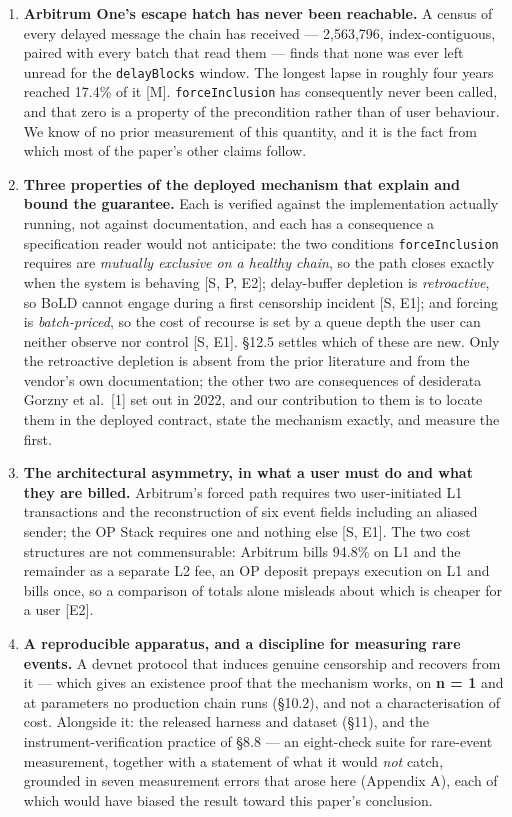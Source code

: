 \documentclass[conference]{IEEEtran}
\renewcommand{\_}{\textunderscore\allowbreak}
\begin{document}
\begin{enumerate}
\def\labelenumi{\arabic{enumi}.}
\item
  \textbf{Arbitrum One's escape hatch has never been reachable.} A
  census of every delayed message the chain has received --- 2,563,796,
  index-contiguous, paired with every batch that read them --- finds
  that none was ever left unread for the \texttt{delayBlocks} window.
  The longest lapse in roughly four years reached 17.4\% of it {[}M{]}.
  \texttt{forceInclusion} has consequently never been called, and that
  zero is a property of the precondition rather than of user behaviour.
  We know of no prior measurement of this quantity, and it is the fact
  from which most of the paper's other claims follow.
\item
  \textbf{Three properties of the deployed mechanism that explain and
  bound the guarantee.} Each is verified against the implementation
  actually running, not against documentation, and each has a
  consequence a specification reader would not anticipate: the two
  conditions \texttt{forceInclusion} requires are \emph{mutually
  exclusive on a healthy chain}, so the path closes exactly when the
  system is behaving {[}S, P, E2{]}; delay-buffer depletion is
  \emph{retroactive}, so BoLD cannot engage during a first censorship
  incident {[}S, E1{]}; and forcing is \emph{batch-priced}, so the cost
  of recourse is set by a queue depth the user can neither observe nor
  control {[}S, E1{]}. §12.5 settles which of these are new. Only the
  retroactive depletion is absent from the prior literature and from the
  vendor's own documentation; the other two are consequences of
  desiderata Gorzny et al.~{[}1{]} set out in 2022, and our contribution
  to them is to locate them in the deployed contract, state the
  mechanism exactly, and measure the first.
\item
  \textbf{The architectural asymmetry, in what a user must do and what
  they are billed.} Arbitrum's forced path requires two user-initiated
  L1 transactions and the reconstruction of six event fields including
  an aliased sender; the OP Stack requires one and nothing else {[}S,
  E1{]}. The two cost structures are not commensurable: Arbitrum bills
  94.8\% on L1 and the remainder as a separate L2 fee, an OP deposit
  prepays execution on L1 and bills once, so a comparison of totals
  alone misleads about which is cheaper for a user {[}E2{]}.
\item
  \textbf{A reproducible apparatus, and a discipline for measuring rare
  events.} A devnet protocol that induces genuine censorship and
  recovers from it --- which gives an existence proof that the mechanism
  works, on \textbf{n = 1} and at parameters no production chain runs
  (§10.2), and not a characterisation of cost. Alongside it: the
  released harness and dataset (§11), and the instrument-verification
  practice of §8.8 --- an eight-check suite for rare-event measurement,
  together with a statement of what it would \emph{not} catch, grounded
  in seven measurement errors that arose here (Appendix A), each of
  which would have biased the result toward this paper's conclusion.
\end{enumerate}
\end{document}
